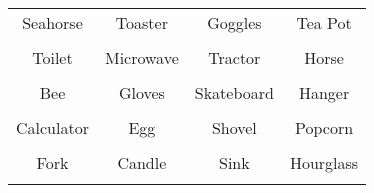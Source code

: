 \documentclass[12pt,a4paper]{article}
\begin{document}
\thispagestyle{empty}
\begin{table}[]
\centering
\Huge
\begin{tabular}{cccc}
 Seahorse& Toaster& Goggles& Tea Pot\\  & & & \\
 Toilet& Microwave& Tractor& Horse\\  & & & \\
 Bee& Gloves& Skateboard& Hanger\\  & & & \\
 Calculator& Egg& Shovel& Popcorn\\  & & & \\
 Fork& Candle& Sink& Hourglass\\  & & & \\
\end{tabular}
\end{table}
\end{document}

